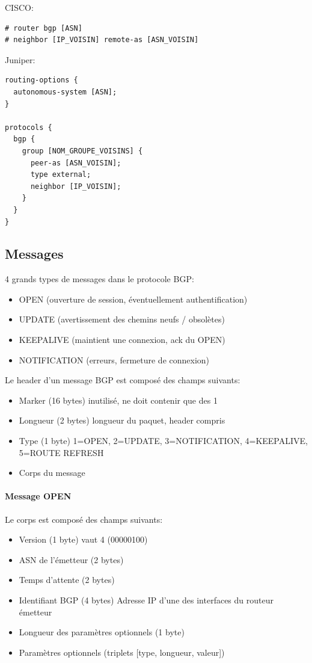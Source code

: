 \documentclass{article}
\begin{document}
\begin{sffamily}
CISCO:

\begin{verbatim}
# router bgp [ASN]
# neighbor [IP_VOISIN] remote-as [ASN_VOISIN]
\end{verbatim}

Juniper:

\begin{verbatim}
routing-options {
  autonomous-system [ASN];
}

protocols {
  bgp {
    group [NOM_GROUPE_VOISINS] {
      peer-as [ASN_VOISIN];
      type external;
      neighbor [IP_VOISIN];
    }
  }
}
\end{verbatim}

\subsection{Messages}

4 grands types de messages dans le protocole BGP:

\begin{itemize}
\item OPEN (ouverture de session, éventuellement authentification)
\item UPDATE (avertissement des chemins neufs / obsolètes)
\item KEEPALIVE (maintient une connexion, ack du OPEN)
\item NOTIFICATION (erreurs, fermeture de connexion)
\end{itemize}

Le header d'un message BGP est composé des champs suivants:

\begin{itemize}
\item Marker (16 bytes) inutilisé, ne doit contenir que des 1
\item Longueur (2 bytes) longueur du paquet, header compris
\item Type (1 byte) 1=OPEN, 2=UPDATE, 3=NOTIFICATION, 4=KEEPALIVE,
  5=ROUTE REFRESH
\item Corps du message
\end{itemize}

\paragraph{Message OPEN}

Le corps est composé des champs suivants:

\begin{itemize}
\item Version (1 byte) vaut 4 (00000100)
\item ASN de l'émetteur (2 bytes)
\item Temps d'attente (2 bytes)
\item Identifiant BGP (4 bytes) Adresse IP d'une des interfaces du
  routeur émetteur
\item Longueur des paramètres optionnels (1 byte)
\item Paramètres optionnels (triplets [type, longueur, valeur])
\end{itemize}


\end{sffamily}
\end{document}
